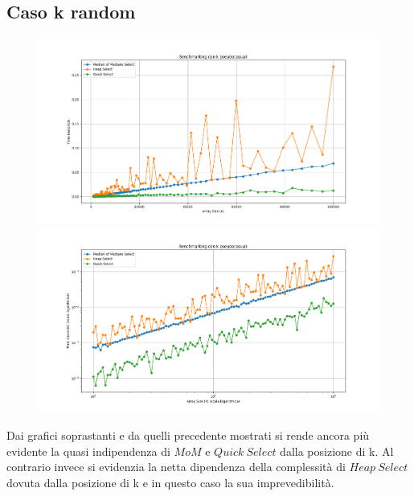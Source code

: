 \documentclass[a4paper]{article}
\begin{document}
\subsection{Caso k random}
\begin{figure}[h]
            \centering
            \includegraphics[width=.83\textwidth]{graphs/K_random_n.png}
            \includegraphics[width=.83\textwidth]{graphs/K_random_2xlog.png}
\end{figure}
Dai grafici soprastanti e da quelli precedente mostrati si rende ancora più evidente la quasi indipendenza di $MoM$ e $Quick\ Select$ dalla posizione di k. Al contrario invece si evidenzia la netta dipendenza della complessità di $Heap\ Select$ dovuta dalla posizione di k e in questo caso la sua imprevedibilità.\\
\newpage
\end{document}
